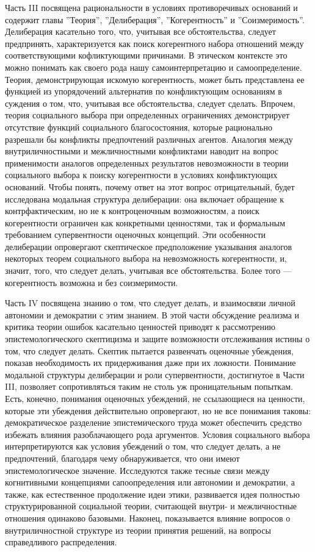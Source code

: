 \documentclass[11pt]{book}
\begin{document}
Часть III посвящена рациональности в условиях противоречивых оснований и содержит главы ''Теория'', ''Делиберация'', ''Когерентность'' и ''Соизмеримость''. Делиберация касательно того, что, учитывая все обстоятельства, следует предпринять, характеризуется как поиск когерентного набора отношений между соответствующими кофликтующими причинами. В этическом контексте это можно понимать как своего рода нашу самоинтерпретацию и самоопределение. Теория, демонстрирующая искомую когерентность, может быть представлена ее функцией из упорядочений альтернатив по конфликтующим основаниям в суждения о том, что, учитывая все обстоятельства, следует сделать. Впрочем, теория социального выбора при определенных ограничениях демонстрирует отсутствие функций социального благосостояния, которые рационально разрешали бы конфликты предпочтений различных агентов. Аналогия между внутриличностными и межличностными конфликтами наводит на вопрос применимости аналогов определенных результатов невозможности в теории социального выбора к поиску когерентности в условиях конфликтующих оснований. Чтобы понять, почему ответ на этот вопрос отрицательный, будет исследована модальная структура делиберации: она включает обращение к контрфактическим, но не к контроценочным возможностям, а поиск когерентности ограничен как конкретными ценностями, так и формальным требованием супервентности оценочных концепций. Эти особенности делиберации опровергают скептическое предположение указывания аналогов некоторых теорем социального выбора на невозможность когерентности, и, значит, того, что следует делать, учитывая все обстоятельства. Более того --- когерентность возможна и без соизмеримости.

Часть IV посвящена знанию о том, что следует делать, и взаимосвязи личной автономии и демократии с этим знанием. В этой части обсуждение реализма и критика теории ошибок касательно ценностей приводят к рассмотрению эпистемологического скептицизма и защите возможности отслеживания истины о том, что следует делать. Скептик пытается развенчать оценочные убеждения, показав необходимость их придерживания даже при их ложности. Понимание модальной структуры делиберации и роли супервентности, достигнутое в Части III, позволяет сопротивляться таким не столь уж проницательным попыткам. Есть, конечно, понимания оценочных убеждений, не ссылающиеся на ценности, которые эти убеждения действительно опровергают, но не все понимания таковы: демократическое разделение эпистемического труда может обеспечить средство избежать влияния разоблачающего рода аргументов. Условия социального выбора интерпретируются как условия убеждений о том, что следует делать, а не предпочтений, благодаря чему обнаруживается, что они имеют эпистемологическое значение. Исследуются также тесные связи между когнитивными концепциями сапоопределения или автономии и демократии, а также, как естественное продолжение идеи этики, развивается идея полностью структурированной социальной теории, считающей внутри- и межличностные отношения одинаково базовыми. Наконец, показывается влияние вопросов о внутриличностной структуре из теории принятия решений, на вопросы справедливого распределения.
\end{document}
